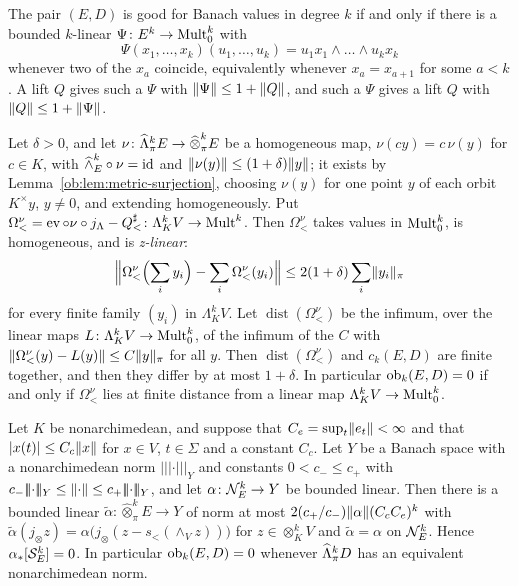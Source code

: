\begin{corollary}\label{ob:cor:adjacent}
The pair $(E,D)$ is good for Banach values in degree $k$ if and only if there is a bounded $k$-linear
$\Psi\colon E^k\to\operatorname{Mult}^k_0$ with
\[
 \Psi(x_1,\dots,x_k)(u_1,\dots,u_k)=u_1x_1\wedge\dots\wedge u_kx_k
\]
whenever two of the $x_a$ coincide, equivalently whenever $x_a=x_{a+1}$ for some $a<k$. A lift $Q$ gives such a $\Psi$ with
$\lVert \Psi\rVert\le1+\lVert Q\rVert$, and such a $\Psi$ gives a lift $Q$ with $\lVert Q\rVert\le1+\lVert \Psi\rVert$.
\end{corollary}

\begin{corollary}\label{ob:cor:z-linear}
Let $\delta>0$, and let $\nu\colon\widehat\Lambda^k_\pi E\to\widehat\otimes^k_\pi E$ be a homogeneous map, $\nu(cy)=c\,\nu(y)$ for $c\in K$,
with $\widehat\wedge^k_E\circ\nu=\mathrm{id}$ and $\lVert \nu(y)\rVert\le(1+\delta)\lVert y\rVert$; it exists by Lemma~\ref{ob:lem:metric-surjection},
choosing $\nu(y)$ for one point $y$ of each orbit $K^\times y$, $y\ne0$, and extending homogeneously. Put
$\Omega^\nu_<=\operatorname{ev}\circ\nu\circ j_\Lambda-Q^\sharp_<\colon\Lambda^k_KV\to\operatorname{Mult}^k$. Then $\Omega^\nu_<$ takes values in $\operatorname{Mult}^k_0$, is
homogeneous, and is \emph{z-linear}:
\[
 \Bigl\lVert\Omega^\nu_<\Bigl(\sum_iy_i\Bigr)-\sum_i\Omega^\nu_<(y_i)\Bigr\rVert\le2(1+\delta)\sum_i\lVert y_i\rVert_\pi
\]
for every finite family $(y_i)$ in $\Lambda^k_KV$. Let $\operatorname{dist}(\Omega^\nu_<)$ be the infimum, over the linear maps
$L\colon\Lambda^k_KV\to\operatorname{Mult}^k_0$, of the infimum of the $C$ with $\lVert \Omega^\nu_<(y)-L(y)\rVert\le C\lVert y\rVert_\pi$ for all $y$. Then
$\operatorname{dist}(\Omega^\nu_<)$ and $c_k(E,D)$ are finite together, and then they differ by at most $1+\delta$. In
particular $\operatorname{ob}_k(E,D)=0$ if and only if $\Omega^\nu_<$ lies at finite distance from a linear map $\Lambda^k_KV\to\operatorname{Mult}^k_0$.
\end{corollary}

\begin{theorem}\label{ob:thm:ultrametric}
Let $K$ be nonarchimedean, and suppose that $C_e=\sup_t\lVert e_t\rVert<\infty$ and that $\lvert x(t)\rvert\le C_c\lVert x\rVert$ for $x\in V$,
$t\in\Sigma$ and a constant $C_c$. Let $Y$ be a Banach space with a nonarchimedean norm $\lvert\!\lvert\!\lvert\cdot\rvert\!\rvert\!\rvert_Y$ and constants $0<c_-\le c_+$
with $c_-\lvert\!\lvert\!\lvert\cdot\rvert\!\rvert\!\rvert_Y\le\norm\cdot\le c_+\lvert\!\lvert\!\lvert\cdot\rvert\!\rvert\!\rvert_Y$, and let $\alpha\colon\mathcal N^k_E\to Y$ be bounded linear. Then there is a bounded linear
$\tilde\alpha\colon\widehat\otimes^k_\pi E\to Y$ of norm at most $2(c_+/c_-)\lVert \alpha\rVert(C_cC_e)^k$ with
$\tilde\alpha(j_\otimes z)=\alpha\bigl(j_\otimes(z-s_<(\wedge_Vz))\bigr)$ for $z\in\otimes^k_KV$ and $\tilde\alpha=\alpha$ on $\mathcal N^k_E$. Hence
$\alpha_*[\mathcal S^k_E]=0$. In particular $\operatorname{ob}_k(E,D)=0$ whenever $\widehat\Lambda^k_\pi D$ has an equivalent nonarchimedean norm.
\end{theorem}

